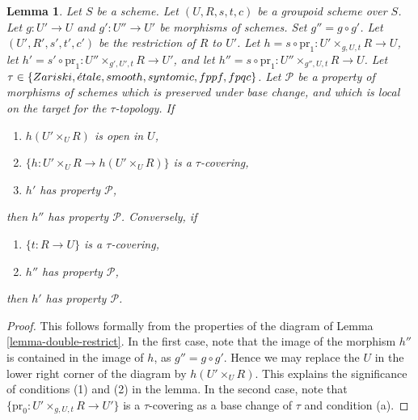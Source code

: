 \documentclass{stacks-project}
\theoremstyle{plain}
\newtheorem{lemma}[subsection]{Lemma}
\theoremstyle{definition}
\theoremstyle{remark}
\numberwithin{equation}{subsection}
\def\etale{{\acute{e}tale}}
\begin{document}
\begin{lemma}
\label{lemma-double-restrict-property}
Let $S$ be a scheme.
Let $(U, R, s, t, c)$ be a groupoid scheme over $S$.
Let $g : U' \to U$ and $g' : U'' \to U'$ be morphisms of schemes.
Set $g'' = g \circ g'$.
Let $(U', R', s', t', c')$ be the restriction of $R$ to $U'$.
Let $h = s \circ \text{pr}_1 : U' \times_{g, U, t} R \to U$,
let $h' = s' \circ \text{pr}_1 : U'' \times_{g', U', t} R \to U'$, and
let $h'' = s \circ \text{pr}_1 : U'' \times_{g'', U, t} R \to U$.
Let $\tau \in \{Zariski, \linebreak[0] \etale, \linebreak[0]
smooth, \linebreak[0] syntomic, \linebreak[0] fppf, \linebreak[0] fpqc\}$. Let
$\mathcal{P}$ be a property of morphisms of schemes
which is preserved under base change, and which
is local on the target for the $\tau$-topology. If
\begin{enumerate}
\item $h(U' \times_U R)$ is open in $U$,
\item $\{h : U' \times_U R \to h(U' \times_U R)\}$ is a $\tau$-covering,
\item $h'$ has property $\mathcal{P}$,
\end{enumerate}
then $h''$ has property $\mathcal{P}$. Conversely, if
\begin{enumerate}
\item[(a)] $\{t : R \to U\}$ is a $\tau$-covering,
\item[(d)] $h''$ has property $\mathcal{P}$,
\end{enumerate}
then $h'$ has property $\mathcal{P}$.
\end{lemma}

\begin{proof}
This follows formally from the properties of the diagram of
Lemma \ref{lemma-double-restrict}.
In the first case, note that the image of the morphism
$h''$ is contained in the image of $h$, as $g'' = g \circ g'$.
Hence we may replace the $U$ in the lower right corner of the
diagram by $h(U' \times_U R)$. This explains the significance of
conditions (1) and (2) in the lemma. In the second case, note that
$\{\text{pr}_0 : U' \times_{g, U, t} R \to U'\}$ is a $\tau$-covering
as a base change of $\tau$ and condition (a).
\end{proof}
\end{document}
